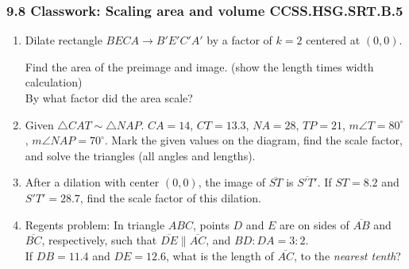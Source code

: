 \documentclass[12pt, twoside]{article}
\begin{document}
\subsubsection*{9.8 Classwork: Scaling area and volume \hfill CCSS.HSG.SRT.B.5}
\begin{enumerate}
  \item Dilate rectangle $BECA \rightarrow B'E'C'A'$ by a factor of $k=2$ centered at $(0,0)$.
  \begin{multicols}{2}

    Find the area of the preimage and image. (show the length times width calculation)\\[5cm]
    By what factor did the area scale?
  \end{multicols}

\item Given $\triangle CAT \sim \triangle NAP$. $CA=14$, $CT=13.3$, $NA=28$, $TP=21$, $m\angle T=80^\circ$, $m\angle NAP = 70^\circ$. Mark the given values on the diagram, find the scale factor, and solve the triangles (all angles and lengths).
  \begin{flushright}
  \end{flushright}

\newpage
\item After a dilation with center $(0,0)$, the image of $\overline{ST}$ is $\overline{S'T'}$. If $ST=8.2$ and $S'T'=28.7$, find the scale factor of this dilation. \vspace{2cm}

\item Regents problem: In triangle $ABC$, points $D$ and $E$ are on sides of $\overline{AB}$ and $\overline{BC}$, respectively, such that $\overline{DE} \parallel \overline{AC}$, and $BD:DA = 3:2$.\\[0.5cm]
If $DB=11.4$ and $DE=12.6$, what is the length of $\overline{AC}$, to the \emph{nearest tenth}?
\begin{flushright}
\end{flushright}



\end{enumerate}
\end{document}
